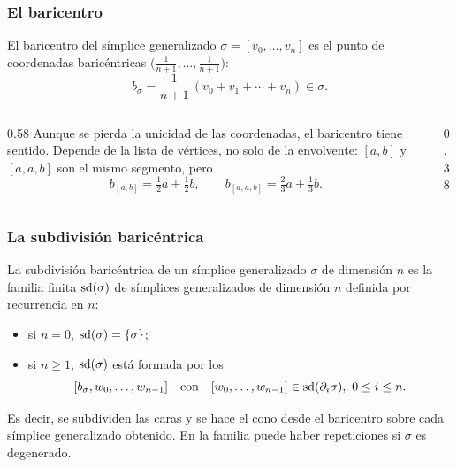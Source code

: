 \begin{frame}
  \frametitle{El baricentro}

  \begin{definition}
    El \alert{baricentro} del símplice generalizado $\sigma=[v_0,\ldots,v_n]$
    es el punto de coordenadas baricéntricas
    $\bigl(\frac{1}{n+1},\ldots,\frac{1}{n+1}\bigr)$:
    \[
      b_\sigma=\frac{1}{n+1}\,(v_0+v_1+\cdots+v_n)\in\sigma.
    \]
  \end{definition}

  \begin{columns}[c]
    \begin{column}{0.58\textwidth}
      Aunque se pierda la unicidad de las coordenadas, el baricentro
      tiene sentido. Depende de la \alert{lista} de vértices, no solo de la
      envolvente: $[a,b]$ y $[a,a,b]$ son el mismo segmento, pero
      \[
        b_{[a,b]}=\tfrac12a+\tfrac12b,
        \qquad
        b_{[a,a,b]}=\tfrac23a+\tfrac13b.
      \]
    \end{column}
    \begin{column}{0.38\textwidth}
      \centering
    \end{column}
  \end{columns}
\end{frame}

\begin{frame}
  \frametitle{La subdivisión baricéntrica}

  \begin{definition}
    La \alert{subdivisión baricéntrica} de un símplice generalizado
    $\sigma$ de dimensión $n$ es la familia finita $\operatorname{sd}(\sigma)$ de
    símplices generalizados de dimensión $n$ definida por recurrencia en
    $n$:
    \begin{itemize}
      \item si $n=0$, $\operatorname{sd}(\sigma)=\{\sigma\}$;
      \item si $n\geq1$, $\operatorname{sd}(\sigma)$ está formada por los
        \[
          [b_\sigma,w_0,\ldots,w_{n-1}]
          \quad\text{con}\quad
          [w_0,\ldots,w_{n-1}]\in\operatorname{sd}(\partial_i\sigma),\ 0\leq i\leq n.
        \]
    \end{itemize}
  \end{definition}

  \medskip

  Es decir, se subdividen las caras y se hace el \alert{cono} desde el
  baricentro sobre cada símplice generalizado obtenido. En la familia puede
  haber repeticiones si $\sigma$ es degenerado.
\end{frame}

